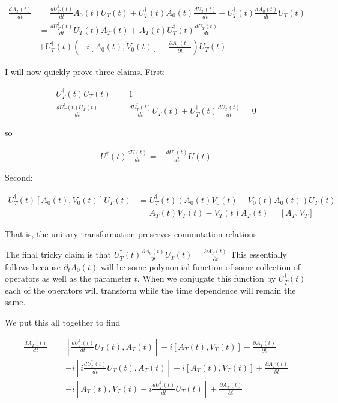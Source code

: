 \documentclass[12pt]{article}
\newcommand{\ddt}[1]{\frac{d #1}{dt}}
\begin{document}
\begin{align}
\ddt{A_T(t)} &= \ddt{U_T^{\dag}(t)}A_0(t)U_T(t) + U_T^{\dag}(t)A_0(t)\ddt{U_T(t)} + U_T^{\dag}(t) \ddt{A_0(t)} U_T(t)\\
&= \ddt{U_T^{\dag}(t)} U_T(t)A_T(t) + A_T(t) U_T^{\dag}(t) \ddt{U_T(t)}\\
&+ U_T^{\dag}(t) \left(-i[A_0(t),V_0(t)] + \frac{\partial A_0(t)}{\partial t}\right)U_T(t)
\end{align}

I will now quickly prove three claims.  First:

\begin{align}
U_T^{\dag}(t) U_T(t) &= 1\\
\ddt{U_T^{\dag}(t) U_T(t)} &= \ddt{U_T^{\dag}(t)}U_T(t) + U_T^{\dag}(t) \ddt{U_T(t)} = 0
\end{align}

so

\begin{align}
U^{\dag}(t) \ddt{U(t)} = - \ddt{U^{\dag}(t)} U(t)
\end{align}

Second:

\begin{align}
U_T^{\dag}(t)[A_0(t),V_0(t)]U_T(t) &= U_T^{\dag}(t)(A_0(t)V_0(t) - V_0(t)A_0(t))U_T(t)\\
&= A_T(t)V_T(t) - V_T(t)A_T(t) = [A_T,V_T]
\end{align}

That is, the unitary transformation preserves commutation relations.

The final tricky claim is that $U_T^{\dag}(t) \frac{\partial A_0(t)}{\partial t} U_T(t) = \frac{\partial A_T(t)}{\partial t}$ This essentially follows because $\partial_t A_0(t)$ will be some polynomial function of some collection of operators as well as the parameter $t$. When we conjugate this function by $U_T^{\dag}(t)$ each of the operators will transform while the time dependence will remain the same.

We put this all together to find

\begin{align}
\ddt{A_T(t)} &= \left[\ddt{U_T^{\dag}(t)}U_T(t),A_T(t) \right] -i [A_T(t),V_T(t)] + \frac{\partial A_T(t)}{\partial t}\\
&= -i  \left[i\ddt{U_T^{\dag}(t)}U_T(t),A_T(t) \right] -i [A_T(t),V_T(t)] + \frac{\partial A_T(t)}{\partial t}\\
&= -i \left[A_T(t), V_T(t) - i \ddt{U_T^{\dag}(t)}U_T(t)\right] + \frac{\partial A_T(t)}{\partial t}
\end{align}
\end{document}
